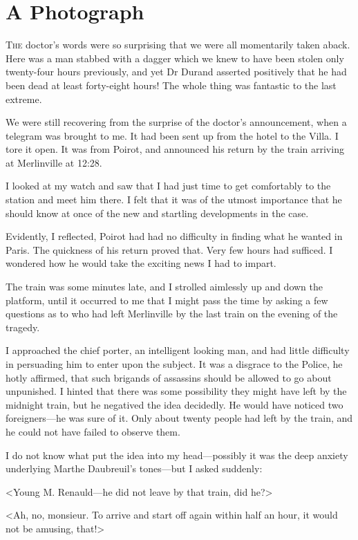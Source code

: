 \chapter{A Photograph}

\lettrine{T}{he} doctor's words were so surprising that we were all momentarily taken aback. Here was a man stabbed with a dagger which we knew to have been stolen only twenty-four hours previously, and yet Dr Durand asserted positively that he had been dead at least forty-eight hours! The whole thing was fantastic to the last extreme. 

 We were still recovering from the surprise of the doctor's announcement, when a telegram was brought to me. It had been sent up from the hotel to the Villa. I tore it open. It was from Poirot, and announced his return by the train arriving at Merlinville at 12:28. 

 I looked at my watch and saw that I had just time to get comfortably to the station and meet him there. I felt that it was of the utmost importance that he should know at once of the new and startling developments in the case. 

 Evidently, I reflected, Poirot had had no difficulty in finding what he wanted in Paris. The quickness of his return proved that. Very few hours had sufficed. I wondered how he would take the exciting news I had to impart. 

 The train was some minutes late, and I strolled aimlessly up and down the platform, until it occurred to me that I might pass the time by asking a few questions as to who had left Merlinville by the last train on the evening of the tragedy. 

 I approached the chief porter, an intelligent looking man, and had little difficulty in persuading him to enter upon the subject. It was a disgrace to the Police, he hotly affirmed, that such brigands of assassins should be allowed to go about unpunished. I hinted that there was some possibility they might have left by the midnight train, but he negatived the idea decidedly. He would have noticed two foreigners—he was sure of it. Only about twenty people had left by the train, and he could not have failed to observe them. 

 I do not know what put the idea into my head—possibly it was the deep anxiety underlying Marthe Daubreuil's tones—but I asked suddenly: 

 <Young M. Renauld—he did not leave by that train, did he?> 

 <Ah, no, monsieur. To arrive and start off again within half an hour, it would not be amusing, that!> 

